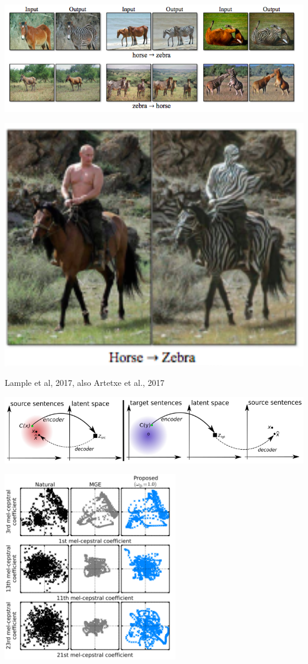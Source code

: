 {

\centerline{\includegraphics[width = 11.0in]{../images/Cycle3}}


\centerline{\includegraphics[width = 6.0in]{../images/Cycle4}}

         {Lample et al, 2017, also Artetxe et al., 2017}

\centerline{\includegraphics[width = 10.0in]{../images/Cycle5}}


\centerline{\includegraphics[width = 3.0in]{../images/Txt2spchGAN}}

}
